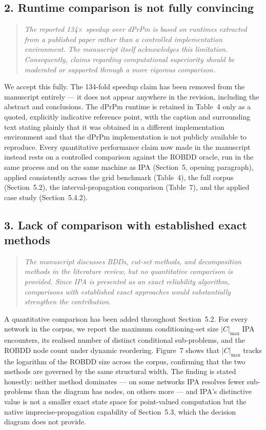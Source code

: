 \documentclass[11pt]{article}
\newenvironment{revcomment}
  {\begin{quote}\itshape\color{gray!60!black}}
  {\end{quote}}
\begin{document}
\subsection*{2. Runtime comparison is not fully convincing}
\begin{revcomment}
The reported 134$\times$ speedup over dPrPm is based on runtimes extracted from a published paper rather than a controlled implementation environment. The manuscript itself acknowledges this limitation. Consequently, claims regarding computational superiority should be moderated or supported through a more rigorous comparison.
\end{revcomment}

We accept this fully. The 134-fold speedup claim has been removed from the manuscript entirely --- it does not appear anywhere in the revision, including the abstract and conclusions. The dPrPm runtime is retained in Table~4 only as a quoted, explicitly indicative reference point, with the caption and surrounding text stating plainly that it was obtained in a different implementation environment and that the dPrPm implementation is not publicly available to reproduce. Every quantitative performance claim now made in the manuscript instead rests on a controlled comparison against the ROBDD oracle, run in the same process and on the same machine as IPA (Section~5, opening paragraph), applied consistently across the grid benchmark (Table~4), the full corpus (Section~5.2), the interval-propagation comparison (Table~7), and the applied case study (Section~5.4.2).

\subsection*{3. Lack of comparison with established exact methods}
\begin{revcomment}
The manuscript discusses BDDs, cut-set methods, and decomposition methods in the literature review, but no quantitative comparison is provided. Since IPA is presented as an exact reliability algorithm, comparisons with established exact approaches would substantially strengthen the contribution.
\end{revcomment}

A quantitative comparison has been added throughout Section~5.2. For every network in the corpus, we report the maximum conditioning-set size $|C|_{\max}$ IPA encounters, its realised number of distinct conditional sub-problems, and the ROBDD node count under dynamic reordering. Figure~7 shows that $|C|_{\max}$ tracks the logarithm of the ROBDD size across the corpus, confirming that the two methods are governed by the same structural width. The finding is stated honestly: neither method dominates --- on some networks IPA resolves fewer sub-problems than the diagram has nodes, on others more --- and IPA's distinctive value is not a smaller exact state space for point-valued computation but the native imprecise-propagation capability of Section~5.3, which the decision diagram does not provide.
\end{document}
